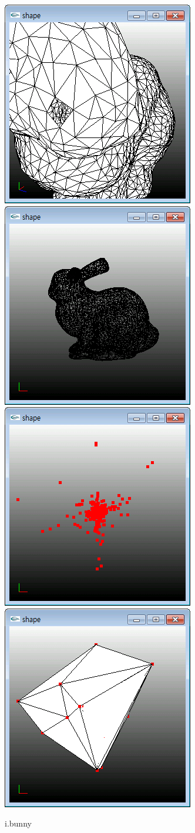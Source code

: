 \documentclass[11pt]{article}
\begin{document}
\begin{figure}[ht]
\centering
\includegraphics[width=.23\textwidth]{FIGS/bunny1}
\hspace{0.2cm}
\includegraphics[width=.23\textwidth]{FIGS/bunny2}
\hspace{0.2cm}
\includegraphics[width=.23\textwidth]{FIGS/bunny3}
\hspace{0.2cm}
\includegraphics[width=.23\textwidth]{FIGS/bunny4}
\caption{i.bunny}
\end{figure}
\end{document}
